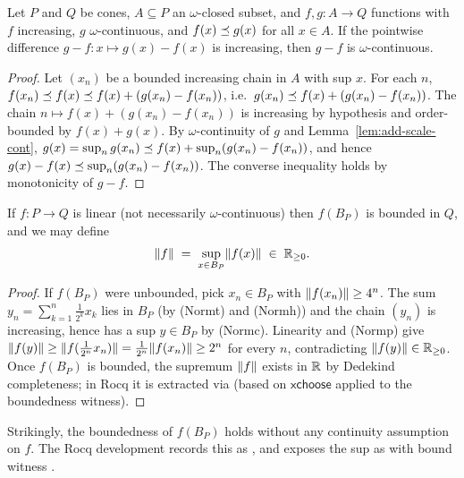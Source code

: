 \begin{lemma}
\label{lem:diff-omega-continuous}
\rocqok{}
Let $P$ and $Q$ be cones, $A \subseteq P$ an $\omega$-closed
subset, and $f, g : A \to Q$ functions with $f$ increasing, $g$
$\omega$-continuous, and $f(x) \preceq g(x)$ for all $x \in A$. If
the pointwise difference $g - f : x \mapsto g(x) - f(x)$ is
increasing, then $g - f$ is $\omega$-continuous.
\end{lemma}

\begin{proof}
Let $(x_n)$ be a bounded increasing chain in $A$ with sup $x$.
For each $n$, $f(x_n) \preceq f(x) \preceq f(x) + (g(x_n) - f(x_n))$,
i.e.\ $g(x_n) \preceq f(x) + (g(x_n) - f(x_n))$. The chain $n
\mapsto f(x) + (g(x_n) - f(x_n))$ is increasing by hypothesis
and order-bounded by $f(x) + g(x)$. By $\omega$-continuity of $g$
and Lemma~\ref{lem:add-scale-cont},
$g(x) = \sup_n g(x_n) \preceq f(x) + \sup_n (g(x_n) - f(x_n))$,
and hence $g(x) - f(x) \preceq \sup_n (g(x_n) - f(x_n))$. The
converse inequality holds by monotonicity of $g - f$.
\end{proof}

\begin{lemma}
\label{lem:linmap-norm}
\rocqok{}
If $f : P \to Q$ is linear (not necessarily $\omega$-continuous)
then $f(B_P)$ is bounded in $Q$, and we may define
\[
  \lVert f \rVert \;=\; \sup_{x \in B_P} \lVert f(x) \rVert \;\in\; \mathbb{R}_{\geq 0}.
\]
\end{lemma}

\begin{proof}
If $f(B_P)$ were unbounded, pick $x_n \in B_P$ with
$\lVert f(x_n) \rVert \geq 4^n$. The sum $y_n = \sum_{k=1}^{n}
\tfrac{1}{2^k} x_k$ lies in $B_P$ (by (Normt) and (Normh)) and
the chain $(y_n)$ is increasing, hence has a sup $y \in B_P$ by
(Normc). Linearity and (Normp) give
$\lVert f(y) \rVert \geq \lVert f(\tfrac{1}{2^n} x_n) \rVert = \tfrac{1}{2^n}
\lVert f(x_n) \rVert \geq 2^n$ for every $n$, contradicting
$\lVert f(y) \rVert \in \mathbb{R}_{\geq 0}$. Once $f(B_P)$ is bounded, the supremum
$\lVert f \rVert$ exists in $\mathbb{R}$ by Dedekind completeness; in Rocq it
is extracted via 
(based on $\mathsf{xchoose}$ applied to the boundedness witness).
\end{proof}

\begin{remark}
Strikingly, the boundedness of $f(B_P)$ holds without any
continuity assumption on $f$. The Rocq development records this as
, and exposes the
sup as  with bound
witness .
\end{remark}

